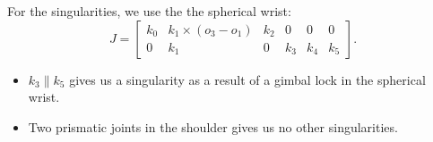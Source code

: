\documentclass[11pt]{article}
\begin{document}
For the singularities, we use the the spherical wrist:
\[
    J = \begin{bmatrix} k_0 & k_1 \times (o_3 - o_1) & k_2 & 0  & 0 & 0 \\ 0 & k_1 & 0 & k_3 & k_4 & k_5 \end{bmatrix} 
.\] 
\begin{itemize}
    \item $k_3 \parallel k_5$ gives us a singularity as a result of a gimbal lock in the spherical wrist.
    \item Two prismatic joints in the shoulder gives us no other singularities.
\end{itemize}
\end{document}

